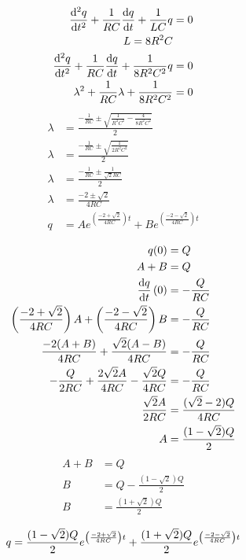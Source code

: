 \documentclass[10pt,\jkfside,a4paper]{article}
\begin{document}
\begin{enumerate}
\begin{enumerate}
\begin{equation}\label{firstpart}
\begin{split}
\dv[2]{q}{t} + \frac{1}{RC}\dv{q}{t} + \frac{1}{LC}q &= 0\\
L = 8R^2C&\\
\dv[2]{q}{t} + \frac{1}{RC}\dv{q}{t} + \frac{1}{8R^2C^2}q &= 0\\
\lambda^2 + \frac{1}{RC}\lambda + \frac{1}{8R^2C^2} &= 0\\
\end{split}
\end{equation}
\begin{equation}
\begin{split}
\lambda &= \frac{-\frac{1}{RC} \pm \sqrt{\frac{1}{R^2C^2} - \frac{4}{8R^2C^2}}}{2}\\
\lambda &= \frac{-\frac{1}{RC} \pm \sqrt{\frac{1}{2R^2C^2}}}{2}\\
\lambda &= \frac{-\frac{1}{RC} \pm \frac{1}{\sqrt{2}RC}}{2}\\
\lambda &= \frac{-2 \pm \sqrt{2}}{4RC}\\
q &= Ae^{\left(\frac{-2 + \sqrt{2}}{4RC}\right)t} + Be^{\left(\frac{-2 - \sqrt{2}}{4RC}\right)t}\\
\end{split}
\end{equation}
\begin{equation}
\begin{split}
q(0) &= Q\\
A + B &= Q\\
\dv{q}{t}\left(0\right) &= -\frac{Q}{RC}\\
\left(\frac{-2 + \sqrt{2}}{4RC}\right)A + \left(\frac{-2 - \sqrt{2}}{4RC}\right)B &= -\frac{Q}{RC}\\
\frac{-2(A + B)}{4RC} + \frac{\sqrt{2}(A - B)}{4RC} &= -\frac{Q}{RC}\\
-\frac{Q}{2RC} + \frac{2\sqrt{2}A}{4RC} - \frac{\sqrt{2}Q}{4RC} &= -\frac{Q}{RC}\\
\frac{\sqrt{2}A}{2RC} &= \frac{(\sqrt{2} - 2)Q}{4RC}\\
A &= \frac{(1 - \sqrt{2})Q}{2}\\
\end{split}
\end{equation}
\begin{equation}
\begin{split}
A + B &= Q\\
B &= Q - \frac{(1 - \sqrt{2})Q}{2}\\
B &= \frac{(1 + \sqrt{2})Q}{2}\\
\end{split}
\end{equation}
\begin{equation}
q = \frac{(1 - \sqrt{2})Q}{2}e^{\left(\frac{-2 + \sqrt{2}}{4RC}\right)t} + \frac{(1 + \sqrt{2})Q}{2}e^{\left(\frac{-2 - \sqrt{2}}{4RC}\right)t}\\
\end{equation}


\end{enumerate}
\end{enumerate}
\end{document}
